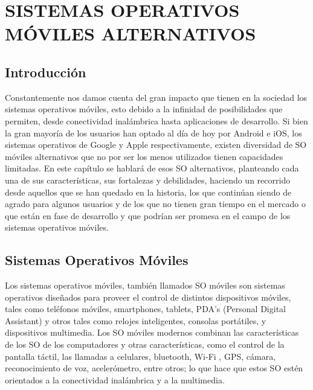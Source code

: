 \chapter*{SISTEMAS OPERATIVOS MÓVILES ALTERNATIVOS}

\section*{Introducción}
Constantemente nos damos cuenta del gran impacto que tienen en la sociedad los sistemas operativos móviles, esto debido a la infinidad 
de posibilidades que permiten, desde conectividad inalámbrica hasta aplicaciones de desarrollo. Si bien la gran mayoría de los usuarios 
han optado al día de hoy por Android e iOS, los sistemas operativos de Google y Apple respectivamente, existen diversidad de SO móviles 
alternativos que no por ser los menos utilizados tienen capacidades limitadas. En este capítulo se hablará de esos SO alternativos, 
planteando cada una de sus características, sus fortalezas y debilidades, haciendo un recorrido desde aquellos que se han quedado en la 
historia, los que continúan siendo de agrado para algunos usuarios y de los que no tienen gran tiempo en el mercado o que están en fase 
de desarrollo y que podrían ser promesa en el campo de los sistemas operativos móviles.

\section*{Sistemas Operativos Móviles}
Los sistemas operativos móviles, también llamados SO móviles son sistemas operativos diseñados para proveer el control de distintos dispositivos móviles, tales como 
teléfonos móviles, smartphones, tablets, PDA’s (Personal Digital Assistant) y otros tales como relojes inteligentes, consolas portátiles, y dispositivos multimedia. Los SO 
móviles modernos combinan las características de los SO de los computadores y otras características, como el control de la pantalla táctil, las llamadas a celulares, 
bluetooth, Wi-Fi , GPS, cámara, reconocimiento de voz, acelerómetro, entre otros; lo que hace que estos SO estén orientados a la conectividad inalámbrica y a la multimedia.

